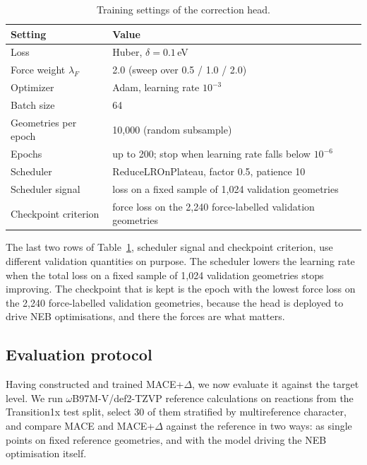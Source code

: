 \begin{table}[H]
  \centering
  \caption{Training settings of the correction head.}
  \label{tab:delta-training}
  \begin{tabular}{ll}
    \toprule
    Setting & Value \\
    \midrule
    Loss & Huber, $\delta = 0.1$\,eV \\
    Force weight $\lambda_F$ & 2.0 (sweep over 0.5 / 1.0 / 2.0) \\
    Optimizer & Adam, learning rate $10^{-3}$ \\
    Batch size & 64 \\
    Geometries per epoch & 10{,}000 (random subsample) \\
    Epochs & up to 200; stop when learning rate falls below $10^{-6}$ \\
    Scheduler & ReduceLROnPlateau, factor 0.5, patience 10 \\
    Scheduler signal & loss on a fixed sample of 1{,}024 validation geometries \\
    Checkpoint criterion & force loss on the 2{,}240 force-labelled validation geometries \\
    \bottomrule
  \end{tabular}
\end{table}

The last two rows of Table~\ref{tab:delta-training}, scheduler signal
and checkpoint criterion, use different validation quantities on
purpose. The
scheduler lowers the learning rate when the total loss on a fixed
sample of 1{,}024 validation geometries stops improving. The
checkpoint that is kept is the epoch with the lowest force loss on
the 2{,}240 force-labelled validation geometries, because the head is
deployed to drive NEB optimisations, and there the forces are what
matters.


\subsection{Evaluation protocol}
\label{sec:delta-protocol}

Having constructed and trained MACE+$\Delta$, we now evaluate it against the target level. We run $\omega$B97M-V/def2-TZVP reference
calculations on reactions from the Transition1x test split, select 30 of
them stratified by multireference character, and compare MACE and
MACE+$\Delta$ against the reference in two ways: as single points on fixed
reference geometries, and with the model driving the NEB optimisation
itself.

